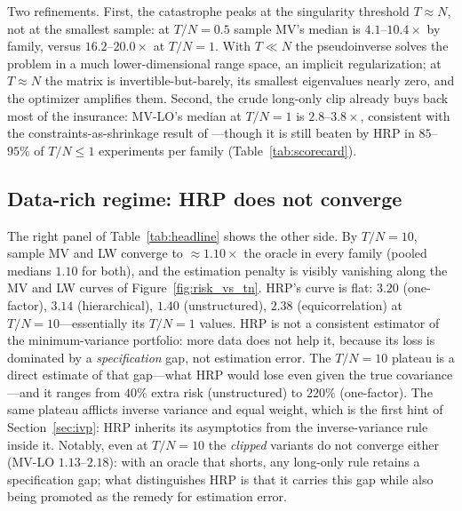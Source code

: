 \documentclass[11pt]{article}
\newcommand{\TN}{T/N}
\begin{document}
Two refinements. First, the catastrophe peaks at the singularity threshold
$T\approx N$, not at the smallest sample: at $\TN=0.5$ sample MV's median is
$4.1$--$10.4\times$ by family, versus $16.2$--$20.0\times$ at $\TN=1$. With
$T\ll N$ the pseudoinverse solves the problem in a much lower-dimensional
range space, an implicit regularization; at $T\approx N$ the matrix is
invertible-but-barely, its smallest eigenvalues nearly zero, and the
optimizer amplifies them. Second, the crude long-only clip already buys back
most of the insurance: MV-LO's median at $\TN=1$ is $2.8$--$3.8\times$,
consistent with the constraints-as-shrinkage result of
\citet{jagannathan2003risk}---though it is still beaten by HRP in
$85$--$95\%$ of $\TN\le1$ experiments per family
(Table~\ref{tab:scorecard}).

\subsection{Data-rich regime: HRP does not converge}
\label{sec:rich}

The right panel of Table~\ref{tab:headline} shows the other side. By
$\TN=10$, sample MV and LW converge to ${\approx}1.10\times$ the oracle in
every family (pooled medians $1.10$ for both), and the estimation penalty is
visibly vanishing along the MV and LW curves of Figure~\ref{fig:risk_vs_tn}.
HRP's curve is flat: $3.20$ (one-factor), $3.14$ (hierarchical), $1.40$
(unstructured), $2.38$ (equicorrelation) at $\TN=10$---essentially its
$\TN=1$ values. HRP is not a consistent estimator of the minimum-variance
portfolio: more data does not help it, because its loss is dominated by a
\emph{specification} gap, not estimation error. The $\TN=10$ plateau is a
direct estimate of that gap---what HRP would lose even given the true
covariance---and it ranges from $40\%$ extra risk (unstructured) to
$220\%$ (one-factor). The same plateau afflicts inverse variance and equal
weight, which is the first hint of Section~\ref{sec:ivp}: HRP inherits its
asymptotics from the inverse-variance rule inside it. Notably, even at
$\TN=10$ the \emph{clipped} variants do not converge either (MV-LO
$1.13$--$2.18$): with an oracle that shorts, any long-only rule retains a
specification gap; what distinguishes HRP is that it carries this gap while
also being promoted as the remedy for estimation error.
\end{document}

